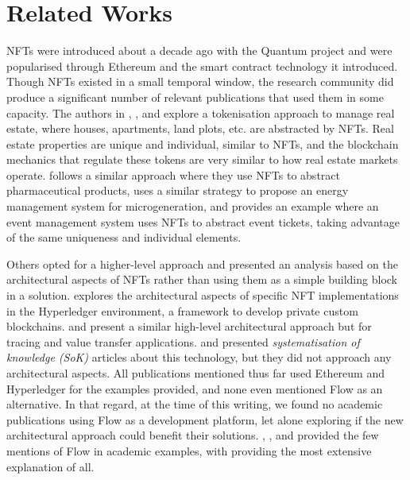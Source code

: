 \documentclass[../NFTComp_IEEE.tex]{subfiles}
\begin{document}
\section{Related Works}
\label{sec:related_works}
NFTs were introduced about a decade ago with the Quantum project \cite{Exmundo2023} and were popularised through Ethereum and the smart contract technology it introduced. Though NFTs existed in a small temporal window, the research community did produce a significant number of relevant publications that used them in some capacity. The authors in \cite{Hung2023}, \cite{Barbuta2024}, and \cite{Sharma2024} explore a tokenisation approach to manage real estate, where houses, apartments, land plots, etc. are abstracted by NFTs. Real estate properties are unique and individual, similar to NFTs, and the blockchain mechanics that regulate these tokens are very similar to how real estate markets operate. \cite{Chiacchio2022} follows a similar approach where they use NFTs to abstract pharmaceutical products, \cite{Karandikar2021} uses a similar strategy to propose an energy management system for microgeneration, and \cite{Regner2019} provides an example where an event management system uses NFTs to abstract event tickets, taking advantage of the same uniqueness and individual elements.
\par
Others opted for a higher-level approach and presented an analysis based on the architectural aspects of NFTs rather than using them as a simple building block in a solution. \cite{Hong2019} explores the architectural aspects of specific NFT implementations in the Hyperledger environment, a framework to develop private custom blockchains. \cite{Yang2022} and \cite{Bal2019} present a similar high-level architectural approach but for tracing and value transfer applications. \cite{Wang2021b} and \cite{Ma2023} presented \textit{systematisation of knowledge (SoK)} articles about this technology, but they did not approach any architectural aspects. All publications mentioned thus far used Ethereum and Hyperledger for the examples provided, and none even mentioned Flow as an alternative. In that regard, at the time of this writing, we found no academic publications using Flow as a development platform, let alone exploring if the new architectural approach could benefit their solutions. \cite{Wang2021}, \cite{Razi2024}, and \cite{Guidi2023} provided the few mentions of Flow in academic examples, with \cite{Guidi2023} providing the most extensive explanation of all.
\par
\end{document}
